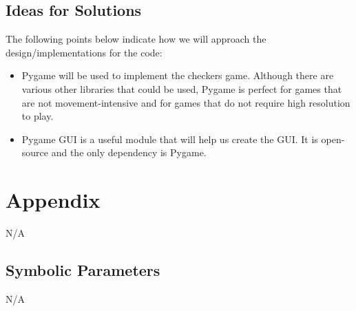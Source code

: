 \documentclass[12pt, titlepage]{article}
\begin{document}
\subsection{Ideas for Solutions}
The following points below indicate how we will approach the design/implementations for the code:
\begin{itemize}
    \item Pygame will be used to implement the checkers game. Although there are various other libraries that could be used, Pygame is perfect for games that are not movement-intensive and for games that do not require high resolution to play.
    \item Pygame GUI is a useful module that will help us create the GUI. It is open-source and the only dependency is Pygame.
\end{itemize}

\newpage

\section{Appendix}
N/A

\subsection{Symbolic Parameters}
N/A


\end{document}

